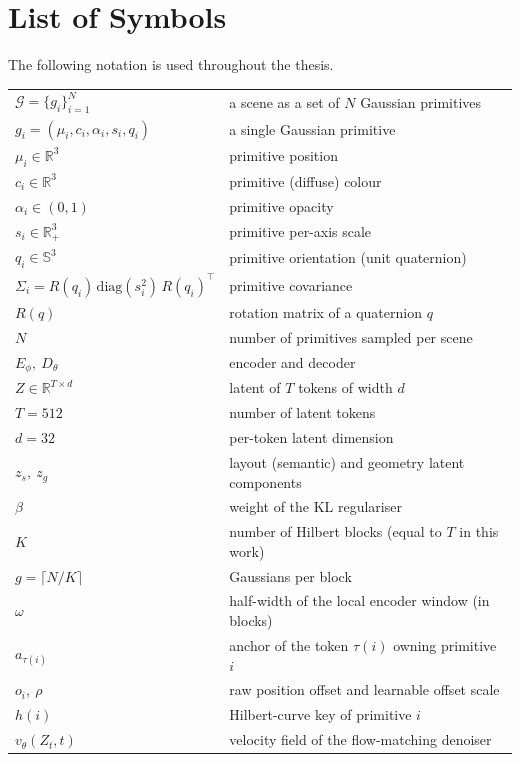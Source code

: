 \chapter{List of Symbols}

The following notation is used throughout the thesis.

\begin{table}[h]
  \centering
  \begin{tabular}{ll}
    $\mathcal{G} = \{g_i\}_{i=1}^{N}$ & a scene as a set of $N$ Gaussian primitives \\
    $g_i = (\mu_i, c_i, \alpha_i, s_i, q_i)$ & a single Gaussian primitive \\
    $\mu_i \in \mathbb{R}^3$ & primitive position \\
    $c_i \in \mathbb{R}^3$ & primitive (diffuse) colour \\
    $\alpha_i \in (0,1)$ & primitive opacity \\
    $s_i \in \mathbb{R}^3_{+}$ & primitive per-axis scale \\
    $q_i \in \mathbb{S}^3$ & primitive orientation (unit quaternion) \\
    $\Sigma_i = R(q_i)\,\mathrm{diag}(s_i^2)\,R(q_i)^\top$ & primitive covariance \\
    $R(q)$ & rotation matrix of a quaternion $q$ \\
    $N$ & number of primitives sampled per scene \\
    $E_\phi,\ D_\theta$ & encoder and decoder \\
    $Z \in \mathbb{R}^{T \times d}$ & latent of $T$ tokens of width $d$ \\
    $T = 512$ & number of latent tokens \\
    $d = 32$ & per-token latent dimension \\
    $z_s,\ z_g$ & layout (semantic) and geometry latent components \\
    $\beta$ & weight of the KL regulariser \\
    $K$ & number of Hilbert blocks (equal to $T$ in this work) \\
    $g = \lceil N/K \rceil$ & Gaussians per block \\
    $\omega$ & half-width of the local encoder window (in blocks) \\
    $a_{\tau(i)}$ & anchor of the token $\tau(i)$ owning primitive $i$ \\
    $o_i,\ \rho$ & raw position offset and learnable offset scale \\
    $h(i)$ & Hilbert-curve key of primitive $i$ \\
    $v_\theta(Z_t, t)$ & velocity field of the flow-matching denoiser \\
  \end{tabular}
\end{table}

